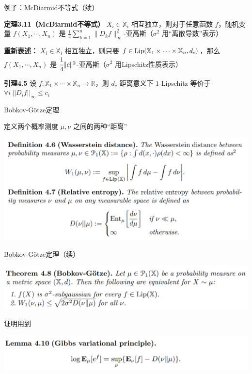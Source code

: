 \documentclass{beamer}
\begin{document}
\begin{frame}{例子：McDiarmid不等式（续）}

\textbf{定理3.11（McDiarmid不等式）} $X_i\in\mathbb{X}_i$ 相互独立，则对于任意函数 $f$，随机变量 $f(X_1, \cdots, X_n)$ 是 $\frac{1}{4} \sum_{k=1}^{n} \|D_k f\|_{\infty}^2$-亚高斯（$\sigma^2$ 用“离散导数”表示）

\quad

\textbf{重新表述：} $X_i\in\mathbb{X}_i$ 相互独立，则只要 $f\in{\rm Lip}(\mathbb{X}_1\times\cdots\times\mathbb{X}_n, d_c)$，那么$f(X_1, \cdots, X_n)$ 是 $\cfrac{1}{4}\|c\|^2$-亚高斯（$\sigma^2$ 用Lipschitz性质表示）

\quad

\textbf{引理4.5} 设 $f: \mathbb{X}_1\times\cdots\times\mathbb{X}_n \to \mathbb{R}$，则 $d_c$ 距离意义下 $1$-Lipschitz 等价于 $\forall i\ ||D_i f||_{\infty} \le c_i$

\end{frame}

\begin{frame}{Bobkov-G{\"o}tze定理}

定义两个概率测度 $\mu, \nu$ 之间的两种“距离”

\begin{center}
\includegraphics[width=1.0\textwidth, frame]{figures/4-6-def-4-7-def.png}
\end{center}

\end{frame}

\begin{frame}{Bobkov-G{\"o}tze定理（续）}

\begin{center}
\includegraphics[width=1.0\textwidth, frame]{figures/4-8-thm.png}
\end{center}

证明用到

\begin{center}
\includegraphics[width=1.0\textwidth, frame]{figures/4-10-lemma.png}
\end{center}

\end{frame}
\end{document}
